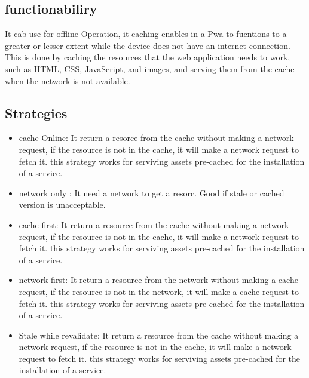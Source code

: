\documentclass[12pt,a4paper, twosite]{article}
\begin{document}
\subsection{functionabiliry}
\label{sec:org24980a8}
It cab use for offline Operation, it caching enables in a Pwa to fucntions to a greater or lesser extent while the device does not have an internet connection. This is done by caching the resources that the web application needs to work, such as HTML, CSS, JavaScript, and images, and serving them from the cache when the network is not available.

\subsection{Strategies}
\label{sec:org2498090}

\begin{itemize}
  \item cache Online: It return a resorce from the cache without making a network request, if the resource is not in the cache, it will make a network request to fetch it. this strategy works for serviving assets pre-cached for the installation of a service.
  \item network only : It need a network to get a resorc. Good if stale or cached version is unacceptable.
  \item cache first: It return a resource from the cache without making a network request, if the resource is not in the cache, it will make a network request to fetch it. this strategy works for serviving assets pre-cached for the installation of a service.
  \item network first: It return a resource from the network without making a cache request, if the resource is not in the network, it will make a cache request to fetch it. this strategy works for serviving assets pre-cached for the installation of a service.
  \item Stale while revalidate: It return a resource from the cache without making a network request, if the resource is not in the cache, it will make a network request to fetch it. this strategy works for serviving assets pre-cached for the installation of a service.
\end{itemize}
\end{document}
